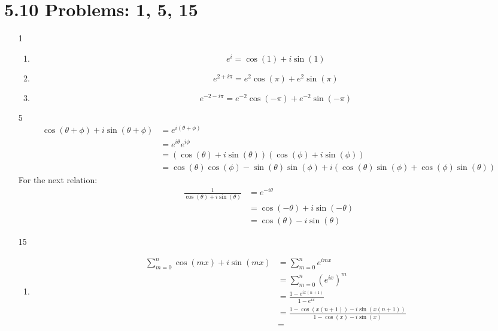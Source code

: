 \documentclass{article}
\begin{document}
  \section{5.10 Problems: 1, 5, 15}
  \begin{enumerate}
    \item[1]
      \begin{enumerate}[label=(\roman*)]
        \item\[e^i=\cos(1)+i\sin(1)\]
        \item\[e^{2+i\pi}=e^2\cos(\pi)+e^2\sin(\pi)\]
        \item\[e^{-2-i\pi}=e^{-2}\cos(-\pi)+e^{-2}\sin(-\pi)\]
      \end{enumerate}
    \item[5]
      \begin{align*}
        \cos(\theta+\phi)+i\sin(\theta+\phi)&=e^{i(\theta+\phi)}\\
        &=e^{i\theta}e^{i\phi}\\
        &=(\cos(\theta)+i\sin(\theta))(\cos(\phi)+i\sin(\phi))\\
        &=\cos(\theta)\cos(\phi)-\sin(\theta)\sin(\phi)+i(\cos(\theta)\sin(\phi)+\cos(\phi)\sin(\theta))
      \end{align*}
      For the next relation:
      \begin{align*}
        \frac{1}{\cos(\theta)+i\sin(\theta)}&=e^{-i\theta}\\
        &=\cos(-\theta)+i\sin(-\theta)\\
        &=\cos(\theta)-i\sin(\theta)
      \end{align*}
    \item[15]
      \begin{enumerate}[label=(\roman*)]
        \item
          \begin{align*}
            \sum_{m=0}^n\cos(mx)+i\sin(mx)&=\sum_{m=0}^ne^{imx}\\
            &=\sum_{m=0}^n\left(e^{ix}\right)^m\\
            &=\frac{1-e^{ix(n+1)}}{1-e^{ix}}\\
            &=\frac{1-\cos(x(n+1))-i\sin(x(n+1))}{1-\cos(x)-i\sin(x)}\\
            &=
          \end{align*}
      \end{enumerate}
  \end{enumerate}
\end{document}
